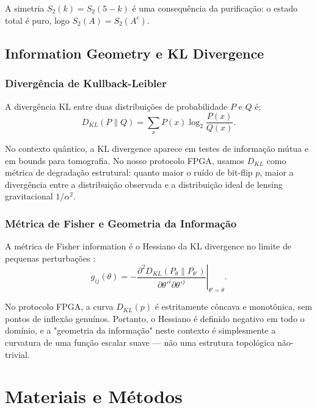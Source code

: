 \documentclass[12pt,a4paper,oneside]{book}
\theoremstyle{definition}
\theoremstyle{remark}
\begin{document}
A simetria $S_2(k) = S_2(5-k)$ é uma consequência da purificação: o estado total é puro, logo $S_2(A) = S_2(A^c)$.

\section{Information Geometry e KL Divergence}

\subsection{Divergência de Kullback-Leibler}

A divergência KL entre duas distribuições de probabilidade $P$ e $Q$ é:
\begin{equation}\label{eq:kl_divergence}
    D_{KL}(P \| Q) = \sum_x P(x) \log_2 \frac{P(x)}{Q(x)}.
\end{equation}

No contexto quântico, a KL divergence aparece em testes de informação mútua \cite{guta2024quantum} e em bounds para tomografia. No nosso protocolo FPGA, usamos $D_{KL}$ como métrica de degradação estrutural: quanto maior o ruído de bit-flip $p$, maior a divergência entre a distribuição observada e a distribuição ideal de lensing gravitacional $1/\alpha^2$.

\subsection{Métrica de Fisher e Geometria da Informação}

A métrica de Fisher information é o Hessiano da KL divergence no limite de pequenas perturbações \cite{marcolli2020geometry}:
\begin{equation}
    g_{ij}(\theta) = -\left.\frac{\partial^2 D_{KL}(P_\theta \| P_{\theta'})}{\partial \theta'^i \partial \theta'^j}\right|_{\theta'=\theta}.
\end{equation}

No protocolo FPGA, a curva $D_{KL}(p)$ é estritamente côncava e monotônica, sem pontos de inflexão genuínos. Portanto, o Hessiano é definido negativo em todo o domínio, e a "geometria da informação" neste contexto é simplesmente a curvatura de uma função escalar suave — não uma estrutura topológica não-trivial.

\chapter{Materiais e Métodos}\label{chap:metodos}
\end{document}
